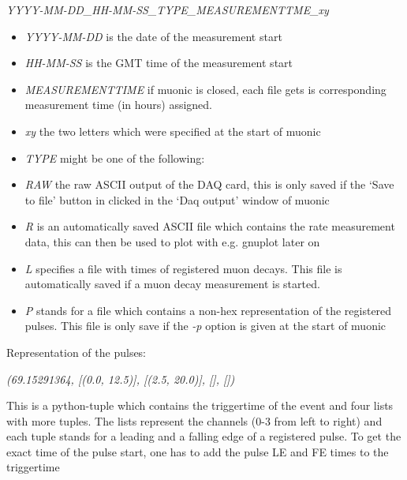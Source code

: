 \documentclass[letterpaper,10pt,english]{sphinxmanual}
\begin{document}
\emph{YYYY-MM-DD\_HH-MM-SS\_TYPE\_MEASUREMENTTME\_xy}
\begin{itemize}
\item {} 
\emph{YYYY-MM-DD} is the date of the measurement start

\item {} 
\emph{HH-MM-SS} is the GMT time of the measurement start

\item {} 
\emph{MEASUREMENTTIME} if muonic is closed, each file gets is corresponding measurement time (in hours) assigned.

\item {} 
\emph{xy} the two letters which were specified at the start of muonic

\item {} 
\emph{TYPE} might be one of the following:

\end{itemize}
\begin{itemize}
\item {} 
\emph{RAW} the raw ASCII output of the DAQ card, this is only saved if the `Save to file' button in clicked in the `Daq output' window of muonic

\item {} 
\emph{R} is an automatically saved ASCII file which contains the rate measurement data, this can then be used to plot with e.g. gnuplot later on

\item {} 
\emph{L} specifies a file with times of registered muon decays. This file is automatically saved if a muon decay measurement is started.

\item {} 
\emph{P} stands for a file which contains a non-hex representation of the registered pulses. This file is only save if the \emph{-p} option is given at the start of muonic

\end{itemize}

Representation of the pulses:

\emph{(69.15291364, {[}(0.0, 12.5){]}, {[}(2.5, 20.0){]}, {[}{]}, {[}{]})}

This is a python-tuple which contains the triggertime of the event and four lists with more tuples. The lists represent the channels (0-3 from left to right) and each tuple stands for a leading and a falling edge of a registered pulse. To get the exact time of the pulse start, one has to add the pulse LE and FE times to the triggertime
\end{document}
